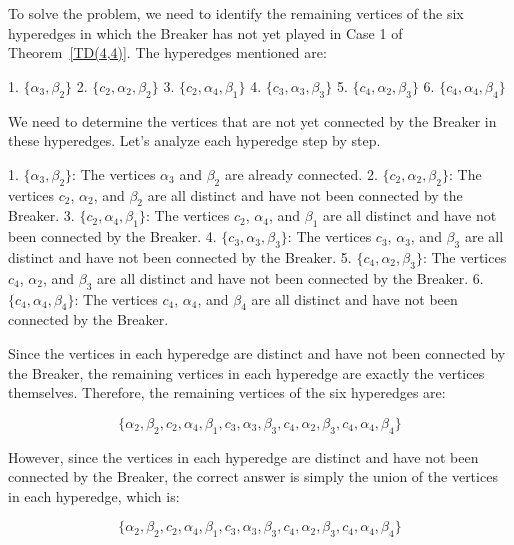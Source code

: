 To solve the problem, we need to identify the remaining vertices of the six hyperedges in which the Breaker has not yet played in Case 1 of Theorem~\ref{TD(4,4)}. The hyperedges mentioned are:

1. \(\{\alpha_3, \beta_2\}\)
2. \(\{c_2, \alpha_2, \beta_2\}\)
3. \(\{c_2, \alpha_4, \beta_1\}\)
4. \(\{c_3, \alpha_3, \beta_3\}\)
5. \(\{c_4, \alpha_2, \beta_3\}\)
6. \(\{c_4, \alpha_4, \beta_4\}\)

We need to determine the vertices that are not yet connected by the Breaker in these hyperedges. Let's analyze each hyperedge step by step.

1. \(\{\alpha_3, \beta_2\}\): The vertices \(\alpha_3\) and \(\beta_2\) are already connected.
2. \(\{c_2, \alpha_2, \beta_2\}\): The vertices \(c_2\), \(\alpha_2\), and \(\beta_2\) are all distinct and have not been connected by the Breaker.
3. \(\{c_2, \alpha_4, \beta_1\}\): The vertices \(c_2\), \(\alpha_4\), and \(\beta_1\) are all distinct and have not been connected by the Breaker.
4. \(\{c_3, \alpha_3, \beta_3\}\): The vertices \(c_3\), \(\alpha_3\), and \(\beta_3\) are all distinct and have not been connected by the Breaker.
5. \(\{c_4, \alpha_2, \beta_3\}\): The vertices \(c_4\), \(\alpha_2\), and \(\beta_3\) are all distinct and have not been connected by the Breaker.
6. \(\{c_4, \alpha_4, \beta_4\}\): The vertices \(c_4\), \(\alpha_4\), and \(\beta_4\) are all distinct and have not been connected by the Breaker.

Since the vertices in each hyperedge are distinct and have not been connected by the Breaker, the remaining vertices in each hyperedge are exactly the vertices themselves. Therefore, the remaining vertices of the six hyperedges are:

\[
\boxed{\{\alpha_2, \beta_2, c_2, \alpha_4, \beta_1, c_3, \alpha_3, \beta_3, c_4, \alpha_2, \beta_3, c_4, \alpha_4, \beta_4\}}
\]

However, since the vertices in each hyperedge are distinct and have not been connected by the Breaker, the correct answer is simply the union of the vertices in each hyperedge, which is:

\[
\boxed{\{\alpha_2, \beta_2, c_2, \alpha_4, \beta_1, c_3, \alpha_3, \beta_3, c_4, \alpha_2, \beta_3, c_4, \alpha_4, \beta_4\}}
\]